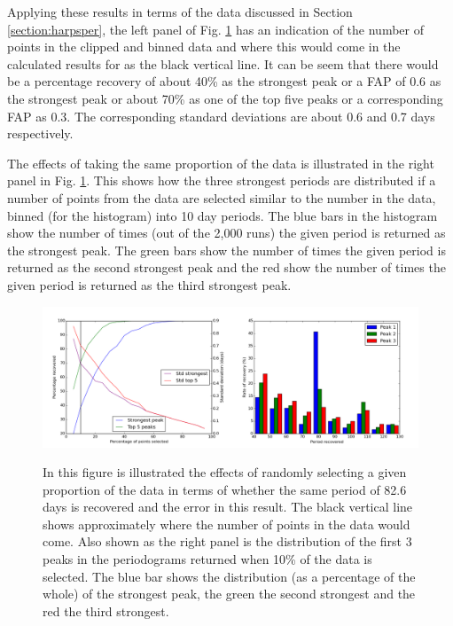 Applying these results in terms of the {\harps} data discussed in Section \ref{section:harpsper}, the left panel of
Fig. \ref{fig:asasprop} has an indication of the number of points in the clipped and binned {\harps} data and where this
would come in the calculated results for {\asas} as the black vertical line. It can be seem that there would be a
percentage recovery of about 40\% as the strongest peak or a FAP of 0.6 as the strongest peak or about 70\% as one of
the top five peaks or a corresponding FAP as 0.3. The corresponding standard deviations are about 0.6 and 0.7 days
respectively.

The effects of taking the same proportion of the data is illustrated in the right panel in Fig. \ref{fig:asasprop}. This
shows how the three strongest periods are distributed if a number of points from the {\asas} data are selected similar
to the number in the {\harps} data, binned (for the histogram) into 10 day periods. The blue bars in the histogram show
the number of times (out of the 2,000 runs) the given period is returned as the strongest peak. The green bars show the
number of times the given period is returned as the second strongest peak and the red show the number of times the given
period is returned as the third strongest peak.

\begin{figure}[!htbp]
\begin{center}
\includegraphics[scale=0.25]{Figures/prop.png} \\
\end{center}   
\caption{In this figure is illustrated the effects of randomly selecting a given proportion of the {\asas} data in terms
  of whether the same period of 82.6 days is recovered and the error in this result. The black vertical line shows
  approximately where the number of points in the {\harps} data would come. Also shown as the right panel is the
  distribution of the first 3 peaks in the periodograms returned when 10\% of the data is selected. The blue bar shows
  the distribution (as a percentage of the whole) of the strongest peak, the green the second strongest and the red the
  third strongest.}
\protect\label{fig:asasprop}
\end{figure}
